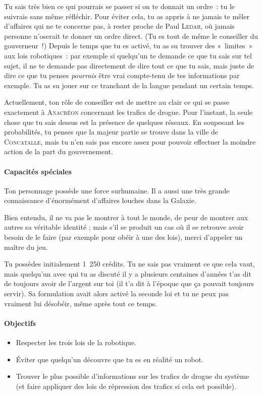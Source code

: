 {Tu sais très bien ce qui pourrais se passer si on te donnait un ordre~: tu le suivrais sans même réfléchir.
Pour éviter cela, tu as appris à ne jamais te mêler d’affaires qui ne te concerne pas, à rester proche de Paul \textsc{Ledar}, où jamais personne n’oserait te donner un ordre direct.  (Tu es tout de même le conseiller du gouverneur~!)
Depuis le temps que tu es activé, tu as su trouver des «~limites~» aux lois robotiques~:  par exemple si quelqu’un te demande ce que tu sais sur tel sujet, il ne te demande pas directement de dire tout ce que tu sais, mais juste de dire ce que tu penses \emph{pourrais} être vrai compte-tenu de tes informations par exemple.
Tu as su jouer sur ce tranchant de la langue pendant un certain temps.

Actuellement, ton rôle de conseiller est de mettre au clair ce qui se passe exactement à \textsc{Anacréon} concernant les trafics de drogue.
Pour l’instant, la seule chose que tu sais dessus est la présence de quelques réseaux.
En soupesant les probabilités, tu penses que la majeur partie se trouve dans la ville de \textsc{Concatalle}, mais tu n’en sais pas encore assez pour pouvoir effectuer la moindre action de la part du gouvernement.

\paragraph{Capacités spéciales}
{
Ton personnage possède une force surhumaine.
Il a aussi une très grande connaissance d’énormément d’affaires louches dans la Galaxie.

Bien entendu, il ne va pas le montrer à tout le monde, de peur de montrer aux autres sa véritable identité ; mais s’il se produit un cas où il se retrouve avoir besoin de le faire (par exemple pour obéir à une des lois), merci d’appeler un maître du jeu.
}

Tu possèdes initialement 1~250 crédits.
Tu ne sais pas vraiment ce que cela vaut, mais quelqu’un avec qui tu as discuté il y a plusieurs centaines d’années t’as dit de toujours avoir de l’argent sur toi (il t’a dit à l’époque que ça pouvait toujours servir).
Sa formulation avait alors activé la seconde loi et tu ne peux pas vraiment lui désobéir, même après tout ce temps.

\paragraph{Objectifs}{
\begin{itemize}
	\item Respecter les trois lois de la robotique.
	\item Éviter que quelqu’un découvre que tu es en réalité un robot.
	\item Trouver le plus possible d’informations sur les trafics de drogue du système (et faire appliquer des lois de répression des trafics si cela est possible).
\end{itemize}
}
}

